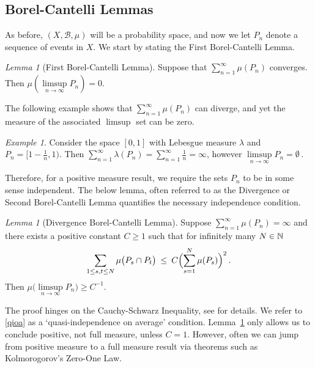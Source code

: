 \documentclass[11pt,reqno]{amsart}
\newcommand{\N}{{\Bbb N}}
\newcommand{\0}{\mathbf{0}}
\newtheorem{lemma}{Lemma}
\theoremstyle{remark}
\numberwithin{equation}{section}
\newtheorem{lemma}[theorem]{Lemma}
\theoremstyle{remark}
\newtheorem*{example}{Example}
\numberwithin{equation}{section}
\begin{document}
\subsection{Borel-Cantelli Lemmas\label{bc}}
As before, $(X, \mathcal{B},\mu)$ will be a probability space, and now we let $P_n$ denote a sequence of events in $X$.
We start by stating the First Borel-Cantelli Lemma. 
\begin{lemma}[First Borel-Cantelli Lemma]\label{cbc}
 Suppose that $\sum_{n=1}^\infty \mu(P_n)$ converges. Then $\mu(\limsup\limits_{n \to \infty} P_n)=0$.
\end{lemma}

 The following example shows that $\sum_{n=1}^\infty \mu(P_n)$ can diverge, and yet the measure of the associated $\limsup$ set can be zero. 
\begin{example}
    Consider the space $[0,1]$ with Lebesgue measure $\lambda$ and $P_n=[1-\frac{1}{n},1)$. Then $\sum_{n=1}^\infty \lambda(P_n) = \sum_{n=1}^\infty \frac{1}{n} = \infty$, however $\limsup\limits_{n \to \infty} P_n =\emptyset \, .$
\end{example}
Therefore, for a positive measure result, we require the sets $P_n$ to be in some sense independent.
    The below lemma, often referred to as the Divergence or Second Borel-Cantelli Lemma quantifies the necessary independence condition.
    \begin{lemma}[Divergence Borel-Cantelli Lemma]\label{dbc}
         Suppose $\sum_{n=1}^\infty\mu(P_n)=\infty$ and there exists a positive constant $ C\geq1$ such that for infinitely many $N \in \N$
    \begin{eqnarray}\label{qioa}
        \sum_{1 \leq s,t \leq N}\mu\big(P_s \cap P_t \big) \: \leq \:  C\Bigl(\sum_{s=1}^N\mu(P_s) \Bigr)^2\, .
    \end{eqnarray}
 Then $\mu\big(\limsup\limits_{n \to \infty} P_n\big) \geq C^{-1}$.
    \end{lemma}
The proof hinges on the Cauchy-Schwarz Inequality, see \cite[Lemma~3]{Harman2} for details. We refer to \eqref{qioa} as a `quasi-independence on average' condition.
Lemma~\ref{dbc} only allows us to conclude positive, not full measure, unless $C=1$. However, often we can jump from positive measure to a full measure result via theorems such as Kolmorogorov's Zero-One Law.
\end{document}
